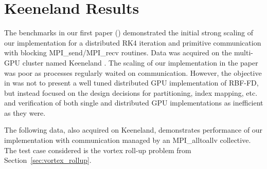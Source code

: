 
\chapter{Keeneland Results}


The benchmarks in our first paper (\cite{BolligFlyerErlebacher2012}) demonstrated the initial strong scaling of our implementation for a distributed RK4 iteration and primitive communication with blocking MPI\_send/MPI\_recv routines. Data was acquired on the multi-GPU cluster named Keeneland \cite{Vetter2011}. The scaling of our implementation in the paper was poor as processes regularly waited on communication. However, the objective in \cite{BolligFlyerErlebacher2012} was not to present a well tuned distributed GPU implementation of RBF-FD, but instead focused on the design decisions for partitioning, index mapping, etc. and verification of both single and distributed GPU implementations as inefficient as they were. 

The following data, also acquired on Keeneland, demonstrates performance of our implementation with communication managed by an MPI\_alltoallv collective. The test case considered is the vortex roll-up problem from Section~\ref{sec:vortex_rollup}. 

